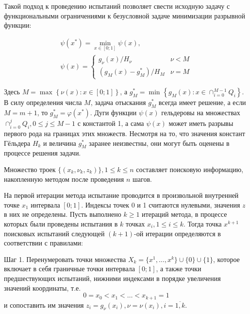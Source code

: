 \documentclass{cmi}
\begin{document}
Такой подход к проведению испытаний позволяет свести исходную задачу с функциональными
ограничениями к безусловной задаче минимизации разрывной функции:

\begin{displaymath}
  \begin{array}{lr}
    \psi (x^{*})=\min_{x\in [0;1]}\psi (x), \\
    \psi (x)={\begin{cases}g_{\nu }(x)/H_{\nu }&\nu <M\\(g_{M}(x)-g_{M}^{*})/H_{M}&\nu =M\end{cases}}
  \end{array}
\end{displaymath}

Здесь \(M=\max_{}^{}\left\{\nu (x):x\in [0;1]\right\}\), а \(g_{M}^{*}=\min _{}^{}\left\{g_{M}(x):x\in \cap _{i=0}^{M-1}Q_{i}\right\}\).
В силу определения числа \(M\), задача отыскания \(g_{M}^{*}\)
всегда имеет решение, а если \(M=m+1\), то \(g_{M}^{*}=\varphi(x^{*})\).
Дуги функции \(\psi (x)\) гельдеровы на множествах \(\cap _{i=0}^{j}Q_{i},0\leq j\leq M-1\)
с константой 1, а сама \(\psi (x)\) может иметь разрывы первого рода на границах этих множеств.
Несмотря на то, что значения констант Гёльдера \(H_k\) и величина \(g_{M}^{*}\) заранее неизвестны,
они могут быть оценены в процессе решения задачи.

Множество троек \(\{(x_k,\nu_k,z_k)\}, 1\leqslant k\leqslant n\) составляет поисковую информацию,
накопленную методом после проведения \(n\) шагов.

На первой итерации метода испытание проводится в произвольной внутренней точке \(x_1\)
интервала \([0;1]\). Индексы точек 0 и 1 считаются нулевыми, значения \(z\) в
них не определены. Пусть выполнено \(k\geqslant 1\) итераций метода,
в процессе которых были проведены испытания в \(k\) точках \(x_i, 1\leqslant i\leqslant k\).
Тогда точка \(x^{k+1}\) поисковых испытаний следующей \((k+1)\)-ой
итерации определяются в соответствии с правилами:

Шаг 1. Перенумеровать точки множества \(X_k=\{x^1,\dotsc,x^k\}\cup\{0\}\cup\{1\}\),
которое включает в себя граничные точки интервала \([0;1]\), а также точки предшествующих
испытаний, нижними индексами в порядке увеличения значений координаты, т.е.
\begin{displaymath}
0=x_0<x_1<\dotsc<x_{k+1}=1
\end{displaymath}
и сопоставить им значения \(z_{i}=g_{\nu }(x_{i}),\nu =\nu (x_{i}),i={\overline {1,k}}\).
\end{document}
